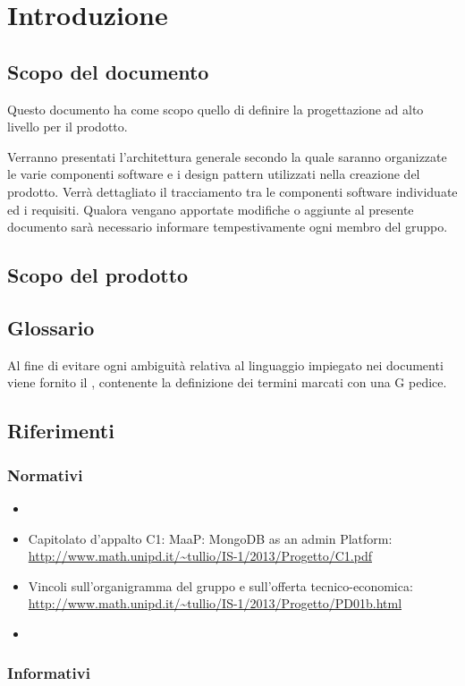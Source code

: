 \section{Introduzione}

\subsection{Scopo del documento}

Questo documento ha come scopo quello di definire la progettazione ad alto livello per il prodotto.

Verranno presentati l'architettura generale secondo la quale saranno organizzate le varie componenti software e i design pattern utilizzati nella creazione del prodotto.
Verrà dettagliato il tracciamento tra le componenti software individuate ed i requisiti.
Qualora vengano apportate modifiche o aggiunte al presente documento sarà necessario informare tempestivamente ogni membro del gruppo.

\subsection{Scopo del prodotto}

\ScopoDelProdotto

\subsection{Glossario}

Al fine di evitare ogni ambiguità relativa al linguaggio impiegato nei documenti viene fornito il \Glossario{}, contenente la definizione dei termini marcati con una G pedice.

\subsection{Riferimenti}
	\label{Riferimenti}
	
		\subsubsection{Normativi}
		
		\begin{itemize}
		\item \NormeDiProgetto
		\item Capitolato d'appalto C1: MaaP: MongoDB as an admin Platform:\\
			\url{http://www.math.unipd.it/~tullio/IS-1/2013/Progetto/C1.pdf}
		\item Vincoli sull'organigramma del gruppo e sull'offerta tecnico-economica:\\
			\url{http://www.math.unipd.it/~tullio/IS-1/2013/Progetto/PD01b.html}
		\item \AnalisiDeiRequisiti  \\	
        \end{itemize}
        
		\subsubsection{Informativi}
		
		
	\pagebreak